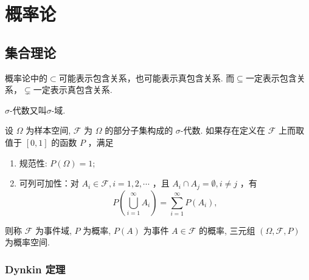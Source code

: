 \setchapterpreamble[u]{\margintoc}
\chapter{概率论}

\section{集合理论}

概率论中的$\subset$可能表示包含关系，也可能表示真包含关系. 而$\subseteq$一定表示包含关系，$\subsetneq$一定表示真包含关系.

$\sigma$-代数又叫$\sigma$-域.

\begin{definition}[概率空间]
    设 $\Omega$ 为样本空间, $\mathscr{F}$ 为 $\Omega$ 的部分子集构成的 $\sigma$-代数. 如果存在定义在 $\mathscr{F}$ 上而取值于 $[0,1]$ 的函数 $P$ ，满足
    \begin{enumerate}[label=(\roman*)]
        \item 规范性: $P(\Omega)=1$;
        \item 可列可加性：对 $A_i \in \mathscr{F}, i=1,2, \cdots$ ，且 $A_i \cap A_j=\emptyset, i \neq j$ ，有
              $$
                  P\left(\bigcup_{i=1}^{\infty} A_i\right)=\sum_{i=1}^{\infty} P\left(A_i\right),
              $$
    \end{enumerate}
    则称 $\mathscr{F}$ 为事件域, $P$ 为概率, $P(A)$ 为事件 $A \in \mathscr{F}$ 的概率, 三元组 $(\Omega, \mathscr{F}, P)$ 为概率空间.
\end{definition}


\subsection{Dynkin 定理}

